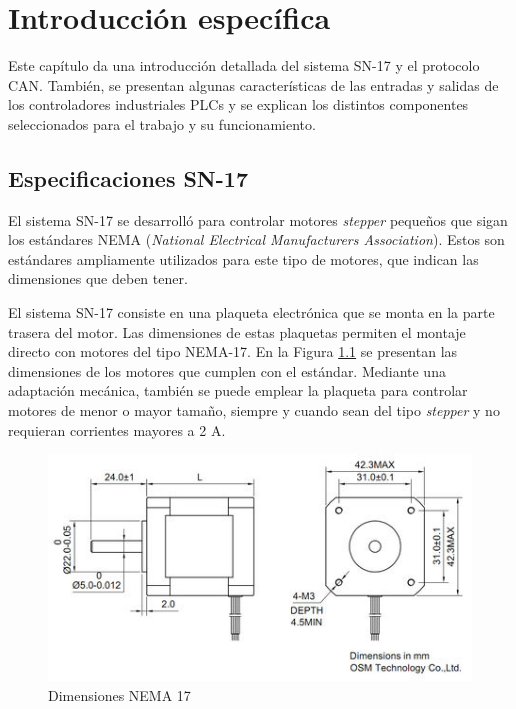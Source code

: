 \chapter{Introducción específica} %

\label{Chapter2}

Este capítulo da una introducción detallada del sistema SN-17 y el protocolo CAN. También, se presentan algunas características de las entradas y salidas de los controladores industriales PLCs y se explican los distintos componentes seleccionados para el trabajo y su funcionamiento.

\section{Especificaciones SN-17}

El sistema SN-17 se desarrolló para controlar motores \textit{stepper} pequeños que sigan los estándares NEMA (\textit{National Electrical Manufacturers Association})\citep{web_nema}. Estos son estándares ampliamente utilizados para este tipo de motores, que indican las dimensiones que deben tener. 

El sistema SN-17 consiste en una plaqueta electrónica que se monta en la parte trasera del motor. Las dimensiones de estas plaquetas permiten el montaje directo con motores del tipo NEMA-17. En la Figura \ref{fig:dimensiones_nema_17} se presentan las dimensiones de los motores que cumplen con el estándar. Mediante una adaptación mecánica, también se puede emplear la plaqueta para controlar motores de menor o mayor tamaño, siempre y cuando sean del tipo \textit{stepper} y no requieran corrientes mayores a 2 A.

\begin{figure}[htbp]
	\centering
	\includegraphics[scale=.9]{./Figures/nema17.jpg}
	\caption{Dimensiones NEMA 17\protect\footnotemark}
	\label{fig:dimensiones_nema_17}
\end{figure}

